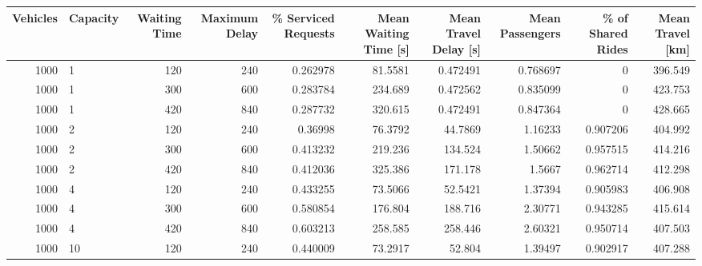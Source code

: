 \begin{tabular}{rlrrrrrrrr}
\hline
   Vehicles & Capacity   &   Waiting Time &   Maximum Delay &   \% Serviced Requests &   Mean Waiting Time [s] &   Mean Travel Delay [s] &   Mean Passengers &   \% of Shared Rides &   Mean Travel [km] \\
\hline
       1000 & 1          &            120 &             240 &              0.262978 &                 81.5581 &                0.472491 &          0.768697 &            0        &            396.549 \\
       1000 & 1          &            300 &             600 &              0.283784 &                234.689  &                0.472562 &          0.835099 &            0        &            423.753 \\
       1000 & 1          &            420 &             840 &              0.287732 &                320.615  &                0.472491 &          0.847364 &            0        &            428.665 \\
       1000 & 2          &            120 &             240 &              0.36998  &                 76.3792 &               44.7869   &          1.16233  &            0.907206 &            404.992 \\
       1000 & 2          &            300 &             600 &              0.413232 &                219.236  &              134.524    &          1.50662  &            0.957515 &            414.216 \\
       1000 & 2          &            420 &             840 &              0.412036 &                325.386  &              171.178    &          1.5667   &            0.962714 &            412.298 \\
       1000 & 4          &            120 &             240 &              0.433255 &                 73.5066 &               52.5421   &          1.37394  &            0.905983 &            406.908 \\
       1000 & 4          &            300 &             600 &              0.580854 &                176.804  &              188.716    &          2.30771  &            0.943285 &            415.614 \\
       1000 & 4          &            420 &             840 &              0.603213 &                258.585  &              258.446    &          2.60321  &            0.950714 &            407.503 \\
       1000 & 10         &            120 &             240 &              0.440009 &                 73.2917 &               52.804    &          1.39497  &            0.902917 &            407.288 \\

\end{tabular}
